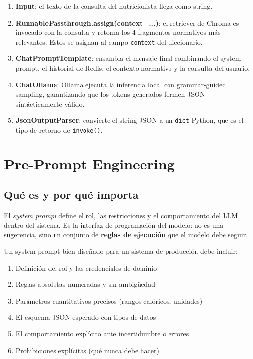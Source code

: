 \documentclass[12pt,a4paper]{article}
\begin{document}
\begin{enumerate}
  \item \textbf{Input}: el texto de la consulta del nutricionista llega
    como string.
  \item \textbf{RunnablePassthrough.assign(context=...)}: el retriever
    de Chroma es invocado con la consulta y retorna los 4 fragmentos
    normativos más relevantes. Estos se asignan al campo \texttt{context}
    del diccionario.
  \item \textbf{ChatPromptTemplate}: ensambla el mensaje final combinando
    el system prompt, el historial de Redis, el contexto normativo y la
    consulta del usuario.
  \item \textbf{ChatOllama}: Ollama ejecuta la inferencia local con
    grammar-guided sampling, garantizando que los tokens generados
    formen JSON sintácticamente válido.
  \item \textbf{JsonOutputParser}: convierte el string JSON a un
    \texttt{dict} Python, que es el tipo de retorno de \texttt{invoke()}.
\end{enumerate}

\section{Pre-Prompt Engineering}
\label{sec:prompt}

\subsection{Qué es y por qué importa}

El \textit{system prompt} define el rol, las restricciones y el comportamiento
del LLM dentro del sistema. Es la interfaz de programación del modelo: no
es una sugerencia, sino un conjunto de \textbf{reglas de ejecución} que el
modelo debe seguir.

Un system prompt bien diseñado para un sistema de producción debe incluir:
\begin{enumerate}
  \item Definición del rol y las credenciales de dominio
  \item Reglas absolutas numeradas y sin ambigüedad
  \item Parámetros cuantitativos precisos (rangos calóricos, unidades)
  \item El esquema JSON esperado con tipos de datos
  \item El comportamiento explícito ante incertidumbre o errores
  \item Prohibiciones explícitas (qué nunca debe hacer)
\end{enumerate}
\end{document}
